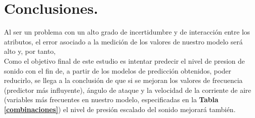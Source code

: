 \section{Conclusiones.}

Al ser un problema con un alto grado de incertidumbre y de interacción entre los atributos, el error asociado a la medición de los valores de nuestro modelo será alto y, por tanto,  \\

Como el objetivo final de este estudio es intentar predecir el nivel de presion de sonido con el fin de, a partir de los modelos de predicción obtenidos, poder reducirlo, se llega a la conclusión de que si se mejoran los valores de frecuencia (predictor más influyente), ángulo de ataque y la velocidad de la corriente de aire (variables más frecuentes en nuestro modelo, especificadas en la \textbf{Tabla \ref{combinaciones}}) el nivel de presión escalado del sonido mejorará también.



